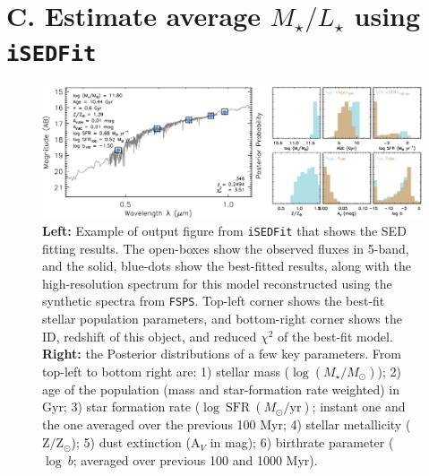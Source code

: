 \documentclass[a4paper,fleqn,usenatbib]{mnras}
\def\logms{{$\log (M_{\star}/M_{\odot})$}}
\begin{document}
\section{C. Estimate average {$M_{\star}/L_{\star}$} using \texttt{iSEDFit}} 
    \label{app:sed} 

    \begin{figure}
        \begin{center}
        \includegraphics[width=\textwidth]{fig/redbcg_isedfit_example.pdf}
        \caption{
            \textbf{Left:} Example of output figure from \texttt{iSEDFit} that shows 
            the SED fitting results. 
            The open-boxes show the observed fluxes in 5-band, and the solid, blue-dots
            show the best-fitted results, along with the high-resolution spectrum for
            this model reconstructed using the synthetic spectra from \texttt{FSPS}. 
            Top-left corner shows the best-fit stellar population parameters, and 
            bottom-right corner shows the ID, redshift of this object, and reduced 
            $\chi^2$ of the best-fit model.~~~
            \textbf{Right:} the Posterior distributions of a few key parameters.
            From top-left to bottom right are: 
            1) stellar mass (\logms{}); 
            2) age of the population (mass and star-formation rate weighted) in Gyr; 
            3) star formation rate ($\log\ \mathrm{SFR}\ (M_{\odot}/\mathrm{yr})$; 
            instant one and the one averaged over the previous 100 Myr; 
            4) stellar metallicity ($\mathrm{Z}/\mathrm{Z}_{\odot}$); 
            5) dust extinction ($\mathrm{A}_V$ in mag);
            6) birthrate parameter ($\log\ b$; averaged over previous 100 and 1000 Myr).
            }
        \label{fig:ised_1}
        \end{center}
    \end{figure}
\end{document}
